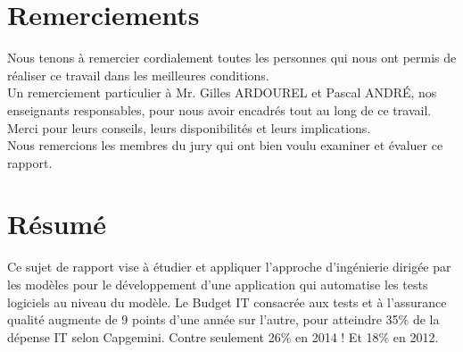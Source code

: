 \documentclass[
10pt, %
a4paper, %
oneside, %
headinclude,footinclude, %
BCOR5mm, %
]{report}
\begin{document}
	\pagestyle{scrheadings} %
								  
														
	\newpage
	\section*{Remerciements} 
	Nous tenons  à remercier cordialement toutes les personnes qui nous ont permis de réaliser ce travail dans les meilleures conditions.\\ 
														
	Un remerciement particulier à Mr. Gilles ARDOUREL et Pascal ANDRÉ, nos enseignants responsables, pour nous avoir encadrés tout au long de ce travail. Merci pour leurs conseils, leurs disponibilités et leurs implications. \\
														
	Nous remercions les membres du jury qui ont bien voulu examiner et évaluer ce rapport.
								
								  
	\newpage
	\section*{Résumé}
														
	Ce sujet de rapport vise à étudier et appliquer l'approche d'ingénierie dirigée par les modèles pour le développement d’une application qui automatise les tests  logiciels au niveau du modèle.
	Le Budget IT consacrée aux tests et à l’assurance qualité augmente de 9 points d’une année sur l’autre, pour atteindre 35\% de la dépense IT selon Capgemini. Contre seulement 26\% en 2014 ! Et 18\% en 2012.
														
\end{document}
